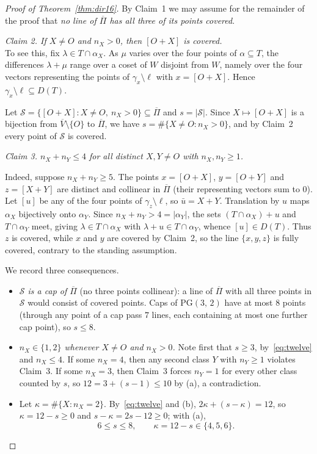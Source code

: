 \documentclass[12pt]{article}
\theoremstyle{definition}
\numberwithin{equation}{section}
\newcommand{\la}{\lambda}
\newcommand{\SSS}{\mathcal{S}}
\newcommand{\PG}[2]{\mathrm{PG}(#1,\,#2)}
\begin{document}
\begin{proof}[Proof of Theorem~\ref{thm:dir16}]
\smallskip
By Claim~1 we may assume for the remainder of the proof that \emph{no line of $\overline\Pi$ has all three of its points covered}.

\smallskip
\noindent\textit{Claim 2.  If $X\neq O$ and $n_X>0$, then $[O+X]$ is covered.}\\
To see this, fix $\la\in T\cap\alpha_X$.  As $\mu$ varies over the four points of $\alpha\subseteq T$, the differences $\la+\mu$ range over a coset of $W$ disjoint from $W$, namely over the four vectors representing the points of $\gamma_x\setminus\ell$ with $x=[O+X]$.  Hence $\gamma_x\setminus\ell\subseteq D(T)$.

\smallskip
Let $\SSS=\{[O+X] : X\neq O,\ n_X>0\}\subseteq\overline\Pi$ and $s=|\SSS|$.  Since $X\mapsto[O+X]$ is a bijection from $\overline V\setminus\{O\}$ to $\overline\Pi$, we have $s=\#\{X\neq O : n_X>0\}$, and by Claim~2 every point of $\SSS$ is
covered.

\smallskip
\noindent\textit{Claim 3.  $n_X+n_Y\le4$ for all distinct $X,Y\neq O$ with $n_X,n_Y\ge1$.}

Indeed, suppose $n_X+n_Y\ge5$.  The points $x=[O+X]$, $y=[O+Y]$ and $z=[X+Y]$ are distinct and collinear in $\overline\Pi$ (their representing vectors sum to $0$).  Let $[u]$ be any of the four points of $\gamma_z\setminus\ell$, so $\bar u=X+Y$.  Translation by $u$ maps $\alpha_X$ bijectively onto $\alpha_Y$. Since $n_X+n_Y>4=|\alpha_Y|$, the sets $(T\cap\alpha_X)+u$ and $T\cap\alpha_Y$ meet, giving $\la\in T\cap\alpha_X$ with $\la+u\in T\cap\alpha_Y$, whence $[u]\in D(T)$.  Thus $z$ is covered, while $x$ and $y$ are covered by Claim~2, so the line $\{x,y,z\}$ is fully covered, contrary to the standing assumption.

\smallskip
We record three consequences.
\begin{itemize}
\item[(a)] \textit{$\SSS$ is a cap of $\overline\Pi$} (no three points collinear): a line of $\overline\Pi$ with all three points in $\SSS$ would consist of covered points.  Caps of $\PG32$ have at most $8$ points (through any point of a cap pass $7$ lines, each containing at most one further cap point), so $s\le8$.
\item[(b)] \textit{$n_X\in\{1,2\}$ whenever $X\neq O$ and $n_X>0$.} Note first that $s\ge3$, by~\eqref{eq:twelve} and $n_X\le4$.  If some $n_X=4$, then any second class $Y$ with $n_Y\ge1$ violates Claim~3.  If some $n_X=3$, then Claim~3 forces $n_Y=1$ for every other class counted by $s$, so $12=3+(s-1)\le10$ by (a), a contradiction. \item[(c)] Let $\kappa=\#\{X : n_X=2\}$.  By~\eqref{eq:twelve} and (b), $2\kappa+(s-\kappa)=12$, so $\kappa=12-s\ge0$ and $s-\kappa=2s-12\ge0$; with (a), 
\begin{equation}\label{eq:srange}
6\le s\le 8,\qquad \kappa=12-s\in\{4,5,6\}.
\end{equation}
\end{itemize}


\end{proof}
\end{document}
